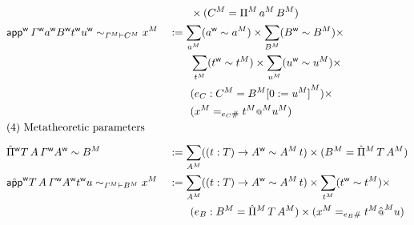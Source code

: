 \begin{alignat*}{5}
      &&& \qquad \times (\model{C}= \model{\Pi}\,\model{a}\,\model{B})
  \\
  &
  \relt{\appw\, \wf{\GG} \wf{a} \wf{B} \wf{t} \wf{u}}{\model{\GG}}{\model{C}}{\model{x}}  &&
    :=
      \sum_{\model{a}} (\wf{a}\sim\model{a})
      \times
      \sum_{\model{B}} (\wf{B}\sim\model{B})
      \times
      \\
      & && \qquad
      \sum_{\model{t}} (\wf{t}\sim\model{t})
      \times
      \sum_{\model{u}} (\wf{u}\sim\model{u})
      \times
      \\
      & &&
     \qquad  (e_C : \model{C} = \model{B}\model{[0 := \model{u}]})
      \times
      \\
      & &&
      \qquad
      (\model{x} = _{e_C \#} \model{t} \model{\oldapp}\model{u})
    \\
  & \rlap{(4) Metatheoretic parameters} \\[0.5em]
  & \Pimw T\,A\,\wf{\GG}\wf{A} \sim \model{B} &&
    :=
      \sum_{\model{A}} ((t : T) \ra \wf{A}\sim\model{A}\, t)
      \times
      (\model{B} = \model{\Pim}\,T\,\model{A})
    \\
    & \relt{\appmw T\,A\,\wf{\GG}\wf{A} \wf{t} u}{\model{\GG}}{\model{B}}{\model{x}}
     &&
     :=
      \sum_{\model{A}} ((t : T) \ra \wf{A}\sim\model{A}\, t)
      \times
      \sum_{\model{t}} (\wf{t}\sim\model{t})
      \times
      \\ & &&
      \qquad
      (e_B : \model{B} = \model{\Pim}\,T\,\model{A})
      \times
      (\model{x} = _{e_B \#} \model{t}\model{\hat{\oldapp}}u)
\end{alignat*}

